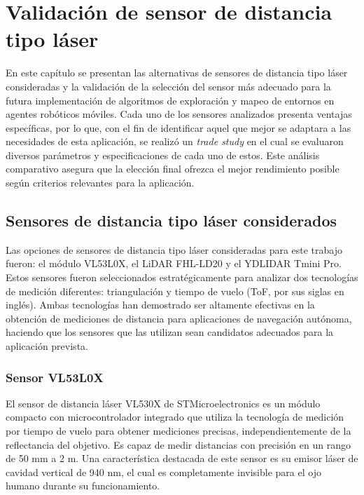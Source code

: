 
\chapter{Validación de sensor de distancia tipo láser}

En este capítulo se presentan las alternativas de sensores de distancia tipo láser consideradas y la validación de la selección del sensor más adecuado para la futura implementación de algoritmos de exploración y mapeo de entornos en agentes robóticos móviles. Cada uno de los sensores analizados presenta ventajas específicas, por lo que, con el fin de identificar aquel que mejor se adaptara a las necesidades de esta aplicación, se realizó un \textit{trade study} en el cual se evaluaron diversos parámetros y especificaciones de cada uno de estos. Este análisis comparativo asegura que la elección final ofrezca el mejor rendimiento posible según criterios relevantes para la aplicación.

\section{Sensores de distancia tipo láser considerados}
Las opciones de sensores de distancia tipo láser consideradas para este trabajo fueron: el módulo VL53L0X, el LiDAR FHL-LD20 y el YDLIDAR Tmini Pro. Estos sensores fueron seleccionados estratégicamente para analizar dos tecnologías de medición diferentes: triangulación y tiempo de vuelo (ToF, por sus siglas en inglés). Ambas tecnologías han demostrado ser altamente efectivas en la obtención de mediciones de distancia para aplicaciones de navegación autónoma, haciendo que los sensores que las utilizan sean candidatos adecuados para la aplicación prevista.

\subsection{Sensor VL53L0X}
El sensor de distancia láser VL530X de STMicroelectronics \cite{stmicroelectronics_vl53l0x_2016} es un módulo compacto con microcontrolador integrado que utiliza la tecnología de medición por tiempo de vuelo para obtener mediciones precisas, independientemente de la reflectancia del objetivo. Es capaz de medir distancias con precisión en un rango de 50 mm a 2 m. Una  característica destacada de este sensor es su emisor láser de cavidad vertical de 940 nm, el cual es completamente invisible para el ojo humano durante su funcionamiento. 
 
